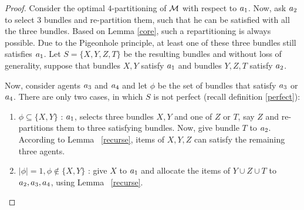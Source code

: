 \begin{proof}
Consider the optimal $4$-partitioning of $\cal M$ with respect to $a_1$. Now,  ask $a_2$ to select $3$ bundles and re-partition them, such that he can be satisfied with all the three bundles. Based on Lemma \ref{core}, such a repartitioning is always possible. Due to the Pigeonhole principle, at least one of these three bundles still satisfies $a_1$. Let $S = \{X,Y,Z,T\}$ be the resulting bundles and without loss of generality, suppose that bundles $X,Y$ satisfy $a_1$ and bundles $Y,Z,T$ satisfy $a_2$.

Now, consider agents $a_3$ and $a_4$ and let $\phi$ be the set of bundles that satisfy $a_3$ or $a_4$. There are only two cases, in which $S$ is not perfect 
(recall definition \ref{perfect}):

\begin{enumerate}
\item $\phi \subseteq \{X,Y\}$ : $a_1$, selects three bundles $X,Y$ and one of $Z$ or $T$, say $Z$ and re-partitions them to three satisfying bundles. Now, give bundle $T$ to $a_2$. According to Lemma  ~\ref{recurse}, items of $X,Y,Z$ can satisfy the remaining three agents.

\item $|\phi|=1, \phi \notin \{X,Y\}$ : give $X$ to $a_1$ and allocate the items of $Y \cup Z \cup T$ to $a_2,a_3,a_4$, using Lemma ~\ref{recurse}.
\end{enumerate}
\end{proof}
\color{black}